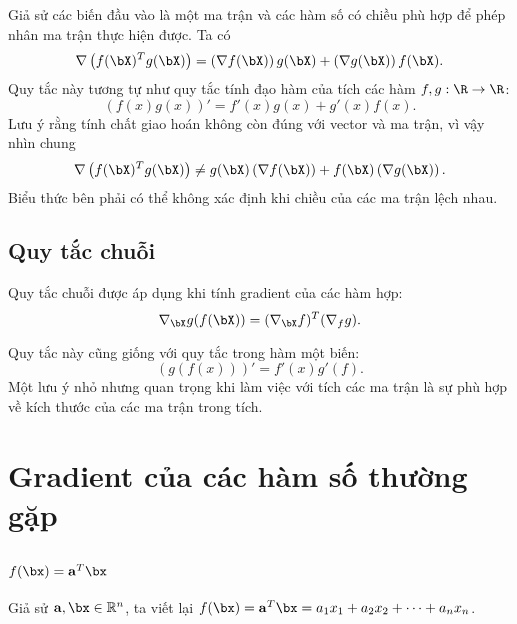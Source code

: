 Giả sử các biến đầu vào là một ma trận và các hàm số có chiều phù hợp để phép
nhân ma trận thực hiện được. Ta có
\begin{equation}
\label{eqn:productrules}
\nabla\left( f(\bX)^Tg(\bX) \right) = \left(\nabla f(\bX)\right) g(\bX) +
\left(\nabla g(\bX)\right) f(\bX).
\end{equation}
Quy tắc này tương tự như quy tắc tính đạo hàm của tích các hàm $f, g: \R \rightarrow \R$:
\begin{equation*}
\left(f(x)g(x)\right)' = f'(x)g(x) + g'(x)f(x).
\end{equation*}
Lưu ý rằng tính chất giao hoán không còn đúng với vector và ma trận, vì vậy nhìn chung 
\begin{equation}
\nabla\left( f(\bX)^Tg(\bX) \right) \neq  g(\bX)\left(\nabla f(\bX)\right) +
f(\bX)\left(\nabla g(\bX)\right). 
\end{equation}
Biểu thức bên phải có thể không xác định khi chiều của các ma trận lệch nhau. 

\subsection{Quy tắc chuỗi}
 
Quy tắc chuỗi được áp dụng khi tính gradient của các hàm hợp:
\begin{equation}
\label{eqn:chainrules}
\nabla_{\bX} g(f(\bX)) = (\nabla_{\bX} f)^T (\nabla_{f}g).
\end{equation}

Quy tắc này cũng giống với quy tắc trong hàm một biến:
\begin{equation*}
(g(f(x)))' = f'(x)g'(f).
\end{equation*}
Một lưu ý nhỏ nhưng quan trọng khi làm việc với tích các ma trận là sự phù hợp
về kích thước của các ma trận trong tích.
\section{Gradient của các hàm số thường gặp }

\subsection{$f(\bx) = \mathbf{a}^T\bx$}

Giả sử $\mathbf{a}, \bx \in \mathbb{R}^n$, ta viết lại $f(\bx) =
\mathbf{a}^T\bx = a_1 x_1 + a_2 x_2 + \dots + a_nx_n$.

